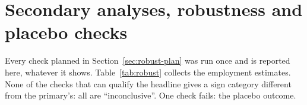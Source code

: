 \section{Secondary analyses, robustness and placebo checks}
\label{sec:robustness}

Every check planned in Section~\ref{sec:robust-plan} was run once and is reported here, whatever it
shows. Table~\ref{tab:robust} collects the employment estimates. None of the checks that can
qualify the headline gives a sign category different from the primary's: all are
``inconclusive''. One check fails: the placebo outcome.

